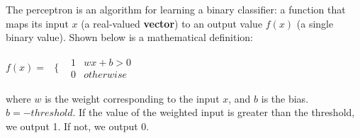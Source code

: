 The perceptron is an algorithm for learning a binary classifier: a function that maps its input $x$ (a real-valued \textbf{vector}) to an output value $f(x)$ (a single binary value). Shown below is a mathematical definition: \\
	
	\begin{center}
		$f(x) = $
		$
\begin{array}{cc}
  \{ & 
    \begin{array}{cc}
    	1 & wx + b > 0 \\
    	0 & otherwise
    \end{array}
\end{array}
		$
	\end{center}
where $w$ is the weight corresponding to the input $x$, and $b$ is the bias. $b = -threshold$. If the value of the weighted input is greater than the threshold, we output 1. If not, we output 0. 